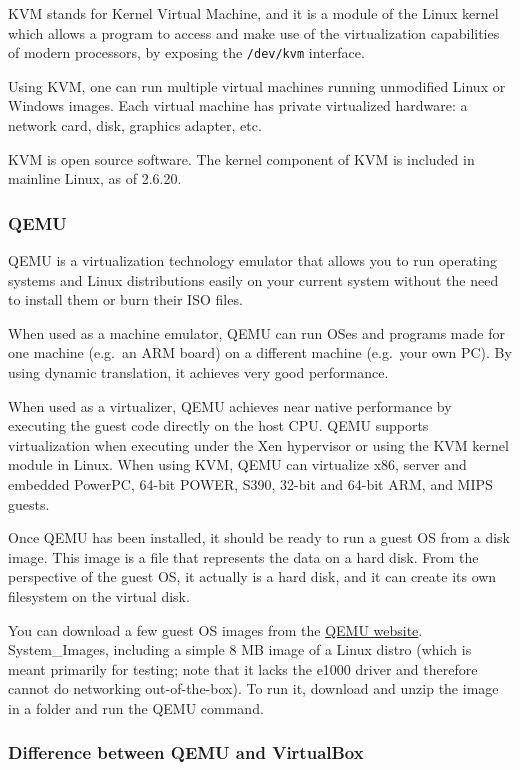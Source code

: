 KVM stands for Kernel Virtual Machine, and it is a module of the Linux
kernel which allows a program to access and make use of the
virtualization capabilities of modern processors, by exposing the
\texttt{/dev/kvm} interface.

Using KVM, one can run multiple virtual machines running unmodified
Linux or Windows images. Each virtual machine has private virtualized
hardware: a network card, disk, graphics adapter, etc.

KVM is open source software. The kernel component of KVM is included in
mainline Linux, as of 2.6.20.

\subsubsection{QEMU}

QEMU is a virtualization technology emulator that allows you to run
operating systems and Linux distributions easily on your current system
without the need to install them or burn their ISO files.

When used as a machine emulator, QEMU can run OSes and programs made for
one machine (e.g.~an ARM board) on a different machine (e.g.~your own
PC). By using dynamic translation, it achieves very good performance.

When used as a virtualizer, QEMU achieves near native performance by
executing the guest code directly on the host CPU. QEMU supports
virtualization when executing under the Xen hypervisor or using the KVM
kernel module in Linux. When using KVM, QEMU can virtualize x86, server
and embedded PowerPC, 64-bit POWER, S390, 32-bit and 64-bit ARM, and
MIPS guests.

Once QEMU has been installed, it should be ready to run a guest OS from
a disk image. This image is a file that represents the data on a hard
disk. From the perspective of the guest OS, it actually is a hard disk,
and it can create its own filesystem on the virtual disk.

You can download a few guest OS images from the
\href{https://wiki.qemu.org/Testing/System_Images}{QEMU website}.
System\_Images, including a simple 8 MB image of a Linux distro (which
is meant primarily for testing; note that it lacks the e1000 driver and
therefore cannot do networking out-of-the-box). To run it, download and
unzip the image in a folder and run the QEMU command.

\subsubsection{Difference between QEMU and VirtualBox}

